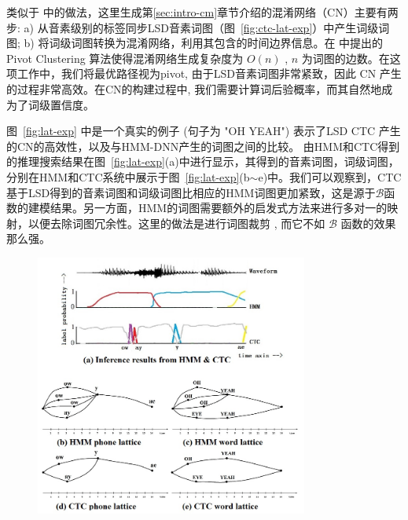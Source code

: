 类似于 \cite{evermann2000large}中的做法，这里生成第\ref{sec:intro-cm}章节介绍的混淆网络（CN）主要有两步: a) 从音素级别的标签同步LSD音素词图（图~\ref{fig:ctc-lat-exp}）中产生词级词图; b) 将词级词图转换为混淆网络，利用其包含的时间边界信息。在 \cite{hakkani2006beyond}中提出的 Pivot Clustering 算法使得混淆网络生成复杂度为 $O(n)$ , $n$ 为词图的边数。在这项工作中，我们将最优路径视为pivot, 由于LSD音素词图非常紧致，因此 CN 产生的过程非常高效。在CN的构建过程中, 我们需要计算词后验概率，而其自然地成为了词级置信度。





图~\ref{fig:lat-exp} 中是一个真实的例子 (句子为 "OH YEAH") 表示了LSD CTC 产生的CN的高效性，以及与HMM-DNN产生的词图之间的比较。
由HMM和CTC得到的推理搜索结果在图~\ref{fig:lat-exp}(a)中进行显示，其得到的音素词图，词级词图，分别在HMM和CTC系统中展示于图~\ref{fig:lat-exp}(b$\sim$e)中。我们可以观察到，CTC基于LSD得到的音素词图和词级词图比相应的HMM词图更加紧致，这是源于$\mathcal{B}$函数的建模结果。另一方面，HMM的词图需要额外的启发式方法来进行多对一的映射，以便去除词图冗余性。这里的做法是进行词图裁剪 \cite{siniscalchi2013bottom}, 而它不如 $\mathcal{B}$ 函数的效果那么强。


\begin{figure}[htb]
  \centering
    \captionstyle{\centering}
    \includegraphics[width=0.8\textwidth]{figure/lat-exp.jpg}
\end{figure}

